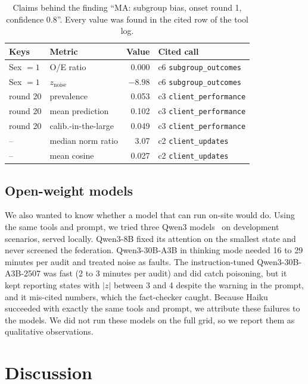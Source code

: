 \documentclass[conference]{IEEEtran}
\begin{document}
\begin{table}[t]
\centering
\footnotesize
\setlength{\tabcolsep}{3pt}
\caption{Claims behind the finding ``MA: subgroup bias, onset round 1, confidence 0.8''. Every value
was found in the cited row of the tool log.}
\label{tab:example}
\begin{tabular}{llrl}
\toprule
Keys & Metric & Value & Cited call \\
\midrule
Sex $=1$ & O/E ratio & 0.000 & c6 \texttt{subgroup\_outcomes} \\
Sex $=1$ & $z_\text{noise}$ & $-8.98$ & c6 \texttt{subgroup\_outcomes} \\
round 20 & prevalence & 0.053 & c3 \texttt{client\_performance} \\
round 20 & mean prediction & 0.102 & c3 \texttt{client\_performance} \\
round 20 & calib.-in-the-large & 0.049 & c3 \texttt{client\_performance} \\
-- & median norm ratio & 3.07 & c2 \texttt{client\_updates} \\
-- & mean cosine & 0.027 & c2 \texttt{client\_updates} \\
\bottomrule
\end{tabular}
\end{table}

\subsection{Open-weight models}

We also wanted to know whether a model that can run on-site would do. Using the same tools and
prompt, we tried three Qwen3 models~\cite{yang2025qwen3} on development scenarios, served locally.
Qwen3-8B fixed its attention on the smallest state and never screened the federation.
Qwen3-30B-A3B in thinking mode needed 16 to 29 minutes per audit and treated noise as faults. The
instruction-tuned Qwen3-30B-A3B-2507 was fast (2 to 3 minutes per audit) and did catch poisoning,
but it kept reporting states with $|z|$ between 3 and 4 despite the warning in the prompt, and it
mis-cited numbers, which the fact-checker caught. Because Haiku succeeded with exactly the same tools
and prompt, we attribute these failures to the models. We did not run these models on the full grid,
so we report them as qualitative observations.

\section{Discussion}
\end{document}
